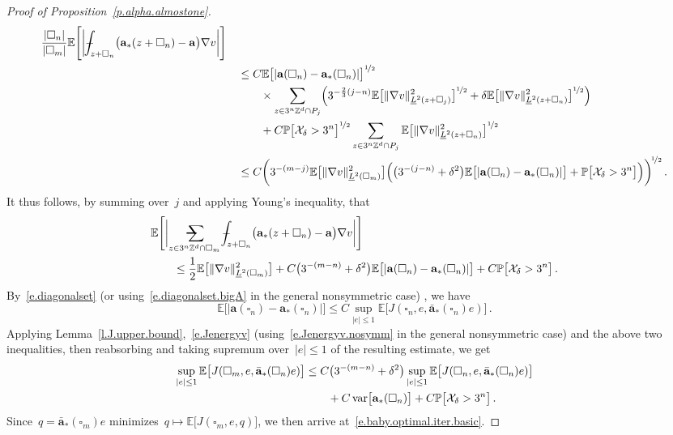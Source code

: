 \documentclass[11pt,twoside]{article} %
\makeatletter
\let\oldsquare\square %
\renewcommand{\square}{\oldsquare}
\numberwithin{equation}{section}
\theoremstyle{definition}
\newcommand*{\Zd}{\ensuremath{\mathbb{Z}^d}}
\renewcommand{\a}{\mathbf{a}}
\newcommand{\ahom}{\bar{\a}}
\newcommand{\cu}{\square}
\renewcommand{\P}{\mathbb{P}}
\newcommand{\E}{\mathbb{E}}
\newcommand{\X}{\mathcal{X}}
\DeclareMathOperator{\var}{var}
\newcommand{\avsum}{\mathop{\mathpalette\avsuminner\relax}\displaylimits}
\newcommand\avsuminner[2]{%
  {\sbox0{$\m@th#1\sum$}%
   \vphantom{\usebox0}%
   \ooalign{%
     \hidewidth
     \smash{\,\rule[.23em]{8.8pt}{1.1pt} \relax}%
     \hidewidth\cr
   ~$\m@th#1\sum$\cr
   }%
  }%
}
\def\Xint#1{\mathchoice
{\XXint\displaystyle\textstyle{#1}}%
{\XXint\textstyle\scriptstyle{#1}}%
{\XXint\scriptstyle\scriptscriptstyle{#1}}%
{\XXint\scriptscriptstyle\scriptscriptstyle{#1}}%
\!\int}
\def\XXint#1#2#3{{\setbox0=\hbox{$#1{#2#3}{\int}$}
\vcenter{\hbox{$#2#3$}}\kern-.5\wd0}}
\def\fint{\Xint-}
\makeatother
\begin{document}
\begin{proof}[{Proof of Proposition~\ref{p.alpha.almostone}}]
\begin{align*}
{\frac{|\cu_n|}{|\cu_m|}   \E \Biggl[ \biggl| \fint_{z+\cu_{n}} \bigl( \a_*(z+\cu_{n}) - \a \bigr) \nabla v  \biggr| 
\Biggr]
} \quad &
\notag \\ &
\leq 
C \E\bigl[ | \a(\cu_{n}) - \a_*(\cu_{n}) | \bigr]^{\nicefrac12}  
\notag \\ & \qquad \times 
\sum_{z\in 3^{n} \Zd \cap P_j} \Bigl( 3^{-\frac23(j-n)} \E\bigl[\| \nabla v \|_{\underline{L}^2(z+\cu_{j})}^2 \bigr]^{\nicefrac12} + \delta \E\bigl[\| \nabla v \|_{\underline{L}^2(z+\cu_{n})}^2 \bigr]^{\nicefrac12}  \Bigr)
\notag \\ & \qquad 
+ C \P\bigl[\X_\delta > 3^n \bigr]^{\nicefrac12}  \sum_{z\in 3^{n} \Zd \cap P_j} \E\bigl[\| \nabla v \|_{\underline{L}^2(z+\cu_{n})}^2 \bigr]^{\nicefrac12} 
\notag \\ &
\leq 
C \biggl( 3^{-(m-j)} 
\E\bigl[\| \nabla v \|_{\underline{L}^2(\cu_{m})}^2 \bigr] \Bigl(  \bigl(3^{-(j-n)}+\delta^2 \bigr) \E\bigl[ | \a(\cu_{n}) - \a_*(\cu_{n}) | \bigr] +   \P\bigl[\X_\delta > 3^n \bigr] \Bigr)\biggr)^{\!\nicefrac12}
\,.
\end{align*}
It thus follows, by summing over~$j$ and applying Young's inequality, that
\begin{align*} 
\lefteqn{
 \E \Biggl[ \biggl| \avsum_{z\in 3^{n} \Zd  \cap \cu_m} 
\fint_{z+\cu_{n}} \bigl( \a_*(z+\cu_{n}) - \a \bigr) \nabla v    \biggr|\Biggr]
} \qquad &
\notag \\ &
\leq \frac12 \E\bigl[\| \nabla v \|_{\underline{L}^2(\cu_{m})}^2 \bigr] + C \bigl( 3^{-(m-n)} + \delta^2 \bigr) \E\bigl[ | \a(\cu_{n}) - \a_*(\cu_{n}) | \bigr] 
+ C \P\bigl[\X_\delta > 3^n \bigr]
\,.
\end{align*}
By~\eqref{e.diagonalset} (or using~\eqref{e.diagonalset.bigA} in the general nonsymmetric case) , we have
\begin{equation*} 
\E\bigl[ | \a(\cu_{n}) - \a_*(\cu_{n}) | \bigr] 
\leq C \sup_{|e| \leq 1} \E\bigl[ J(\cu_n, e, \ahom_*(\cu_n) e ) \bigr]\,.
\end{equation*}
Applying Lemma~\ref{l.J.upper.bound},~\eqref{e.Jenergyv} (using~\eqref{e.Jenergyv.nosymm} in the general nonsymmetric case) and the above two inequalities, then reabsorbing and taking supremum over~$|e| \leq 1$ of the resulting estimate, we get
\begin{align*} 
\sup_{|e| \leq 1} \E\bigl[ J(\cu_m, e, \ahom_*(\cu_n) e ) \bigr]
&
\leq 
C  \bigl( 3^{-(m-n)} + \delta^2 \bigr)  \sup_{|e| \leq 1} \E\bigl[ J(\cu_n, e, \ahom_*(\cu_n) e )\bigr]
\notag \\ & \qquad  + C \var\bigl[\a_*(\cu_n)\bigr] + C \P\bigl[\X_\delta > 3^n \bigr]
 \,.
\end{align*}
Since~$q = \ahom_*(\cu_m) e$ minimizes~$q \mapsto \E\bigl[ J(\cu_m, e, q ) \bigr]$, we then arrive at~\eqref{e.baby.optimal.iter.basic}.
 

\end{proof}
\end{document}
